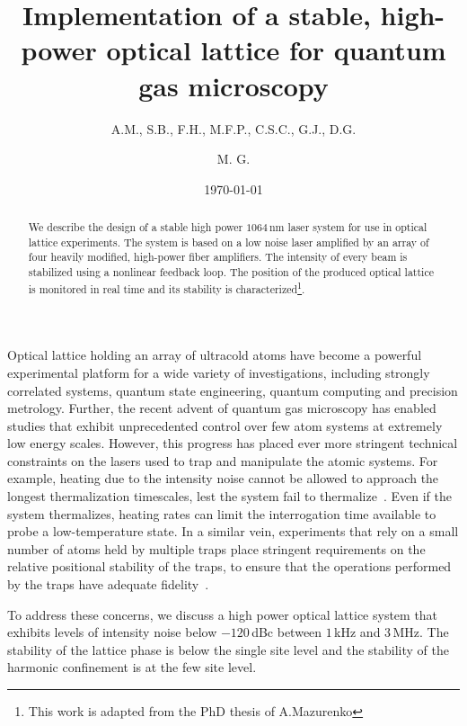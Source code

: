 \documentclass[twocolumn,aps,pra,showpacs,preprintnumbers,bibnotes]{revtex4-1}
\begin{document}
\title{Implementation of a stable, high-power optical lattice for quantum gas microscopy}


\author{A.M., S.B., F.H., M.F.P., C.S.C., G.J., D.G.}
\author{M. G.}

\date{\today}
\begin{abstract}
  We describe the design of a stable high power $1064\,$nm laser system for use in optical lattice experiments. The system is based on a low noise laser amplified by an array of four heavily modified, high-power fiber amplifiers. The intensity of every beam is stabilized using a nonlinear feedback loop. The position of the produced optical lattice is monitored in real time and its stability is characterized\footnote{This work is adapted from the PhD thesis of A.Mazurenko}.
\end{abstract}
\maketitle

Optical lattice holding an array of ultracold atoms have become a powerful experimental platform for a wide variety of investigations, including strongly correlated systems, quantum state engineering, quantum computing and precision metrology.
Further, the recent advent of quantum gas microscopy has enabled studies that exhibit unprecedented control over few atom systems at extremely low energy scales.
However, this progress has placed ever more stringent technical constraints on the lasers used to trap and manipulate the atomic systems.
For example, heating due to the intensity noise cannot be allowed to approach the longest thermalization timescales, lest the system fail to thermalize~\cite{Savard1997}.
Even if the system thermalizes, heating rates can limit the interrogation time available to probe a low-temperature state.
In a similar vein, experiments that rely on a small number of atoms held by multiple traps place stringent requirements on the relative positional stability of the traps, to ensure that the operations performed by the traps have adequate fidelity~\cite{Mazurenko2016}.

To address these concerns, we discuss a high power optical lattice system that exhibits levels of intensity noise below $-120\,$dBc between $1\,$kHz and $3\,$MHz.
The stability of the lattice phase is below the single site level and the stability of the harmonic confinement is at the few site level.
\end{document}
